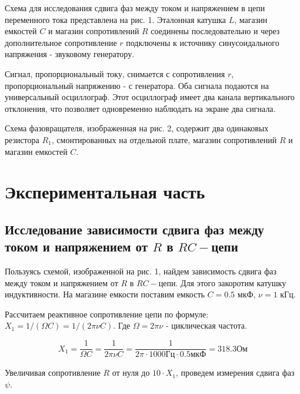 \documentclass[12pt,a4paper]{article}
\begin{document}
    Схема для исследования сдвига фаз между током и напряжением в цепи переменного тока представлена на рис. 1. Эталонная катушка $L$, магазин емкостей $C$ и магазин сопротивлений $R$ соединены последовательно и через дополнительное сопротивление $r$ подключены к источнику синусоидального напряжения - звуковому генератору.
        
    Сигнал, пропорциональный току, снимается с сопротивления $r$, пропорциональный напряжению - с генератора. Оба сигнала подаются на универсальный осциллограф. Этот осциллограф имеет два канала вертикального отклонения, что позволяет одновременно наблюдать на экране два сигнала.
        
     Схема фазовращателя, изображенная на рис. 2, содержит два одинаковых резистора $R_1$, смонтированных на отдельной плате, магазин сопротивлений $R$ и магазин емкостей $C$.

\section{Экспериментальная часть}
    \subsection{Исследование зависимости сдвига фаз между током и напряжением от $R$ в $RC-$цепи}
        Пользуясь схемой, изображенной на рис. 1, найдем зависимость сдвига фаз между током и напряжением от $R$ в $RC-$цепи. Для этого закоротим катушку индуктивности. На магазине емкости поставим емкость $C = 0.5$ мкФ, $\nu = 1$ кГц.
        
        Рассчитаем реактивное сопротивление цепи по формуле: $X_1 = 1/(\Omega C) = 1/(2 \pi \nu C)$. Где $\Omega = 2 \pi \nu$ - циклическая частота.
        
        \[
        X_1 = \frac{1}{\Omega C} = \frac{1}{2 \pi \nu C} = \frac{1}{2 \pi \cdot 1000 \text{Гц} \cdot 0.5 \text{мкФ}} = 318.3 \text{Ом}
        \]
        
        Увеличивая сопротивление $R$ от нуля до $10 \cdot X_1$, проведем измерения сдвига фаз $\psi$.
        
\end{document}
